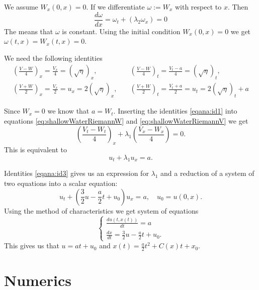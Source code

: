 \documentclass[11pt]{article}
\begin{document}
We assume $W_x(0,x) = 0$. If we differentiate $\omega := W_x$ with respect to $x$. Then
\begin{equation*}
\frac{d \omega}{d x} = \omega_t + \left( \lambda_2 \omega_x \right) = 0
\end{equation*}
The means that $\omega$ is constant. Using the initial condition $W_x(0,x) = 0$ we get $\omega(t,x) = W_x(t,x) = 0$.

We need the following identities
\begin{align}
\left(\frac{V-W}{4}\right)_x = \frac{V_x}{4} = \left( \sqrt{\eta}\right)_x,& \quad \left(\frac{V-W}{4}\right)_t = \frac{V_t - a}{4} = \left( \sqrt{\eta}\right)_t, \label{eqana:id1}\\
\left(\frac{V+W}{2}\right)_x = \frac{V_x}{2} = u_x = 2\left( \sqrt{\eta}\right)_x
, &\quad \left(\frac{V+W}{2}\right)_t = \frac{V_t + a}{2} = u_t = 2\left( \sqrt{\eta}\right)_t + a
\label{eqana:id3}
\end{align}


Since $W_x = 0$ we know that $a = W_t$. Inserting the identities \eqref{eqana:id1}  into equations \eqref{eq:shallowWaterRiemannW} and \eqref{eq:shallowWaterRiemannV} we get
\begin{equation*}
\left( \frac{V_t - W_t}{4} \right)_x + \lambda_1 \left( \frac{V_x - W_x}{4} \right) = 0.
\end{equation*}
This is equivalent to
\begin{equation*}
u_t + \lambda_1 u_x = a.
\end{equation*}

Identities \eqref{eqana:id3} gives us an expression for $\lambda_1$ and a reduction of a system of two equations into a scalar equation:
\begin{equation*}
u_t + \left(\frac{3}{2}u - \frac{a}{2}t + u_0\right) u_x = a,\quad u_0 = u(0,x).
\end{equation*}
Using the method of characteristics we get system of equations
\begin{equation*}
\label{blablabla}
\begin{cases}
\frac{d u(t,x(t))}{dt} = a\\
\frac{d x}{d t} = \frac{3}{2}u - \frac{a}{2}t + u_0.
\end{cases}
\end{equation*}
This gives us that $u = at + u_0$ and  $x(t) = \frac{a}{2}t^2 + C(x) t + x_0$.


%
%


\section{Numerics}
\end{document}
